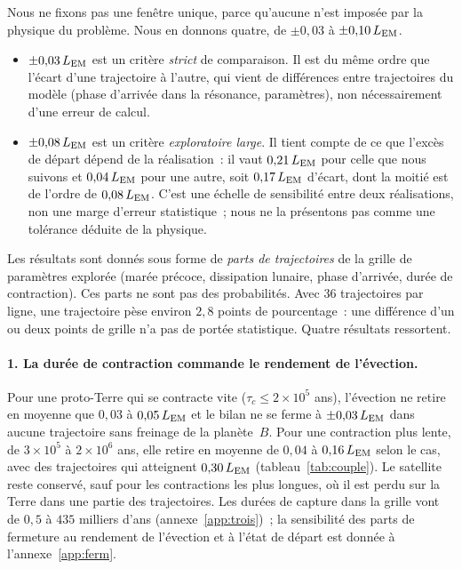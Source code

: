 \documentclass[11pt,a4paper]{article}
\newcommand{\LEM}{\ensuremath{L_{\rm EM}}}
\begin{document}
Nous ne fixons pas une fenêtre unique, parce qu'aucune n'est imposée par la physique du problème. Nous en donnons quatre, de $\pm0{,}03$ à $\pm0{,}10\,\LEM$.
\begin{itemize}[leftmargin=1.6em,itemsep=2pt]
\item $\pm0{,}03\,\LEM$ est un critère \emph{strict} de comparaison. Il est du même ordre que l'écart d'une trajectoire à l'autre, qui vient de différences entre trajectoires du modèle (phase d'arrivée dans la résonance, paramètres), non nécessairement d'une erreur de calcul.
\item $\pm0{,}08\,\LEM$ est un critère \emph{exploratoire large}. Il tient compte de ce que l'excès de départ dépend de la réalisation~: il vaut $0{,}21\,\LEM$ pour celle que nous suivons et $0{,}04\,\LEM$ pour une autre, soit $0{,}17\,\LEM$ d'écart, dont la moitié est de l'ordre de $0{,}08\,\LEM$. C'est une échelle de sensibilité entre deux réalisations, non une marge d'erreur statistique~; nous ne la présentons pas comme une tolérance déduite de la physique.
\end{itemize}
Les résultats sont donnés sous forme de \emph{parts de trajectoires} de la grille de paramètres explorée (marée précoce, dissipation lunaire, phase d'arrivée, durée de contraction). Ces parts ne sont pas des probabilités. Avec $36$ trajectoires par ligne, une trajectoire pèse environ $2{,}8$ points de pourcentage~: une différence d'un ou deux points de grille n'a pas de portée statistique. Quatre résultats ressortent.

\paragraph{1. La durée de contraction commande le rendement de l'évection.} Pour une proto-Terre qui se contracte vite ($\tau_c\le2\times10^5$ ans), l'évection ne retire en moyenne que $0{,}03$ à $0{,}05\,\LEM$ et le bilan ne se ferme à $\pm0{,}03\,\LEM$ dans aucune trajectoire sans freinage de la planète~$B$. Pour une contraction plus lente, de $3\times10^5$ à $2\times10^6$ ans, elle retire en moyenne de $0{,}04$ à $0{,}16\,\LEM$ selon le cas, avec des trajectoires qui atteignent $0{,}30\,\LEM$ (tableau~\ref{tab:couple}). Le satellite reste conservé, sauf pour les contractions les plus longues, où il est perdu sur la Terre dans une partie des trajectoires. Les durées de capture dans la grille vont de $0{,}5$ à $435$ milliers d'ans (annexe~\ref{app:trois})~; la sensibilité des parts de fermeture au rendement de l'évection et à l'état de départ est donnée à l'annexe~\ref{app:ferm}.
\end{document}
